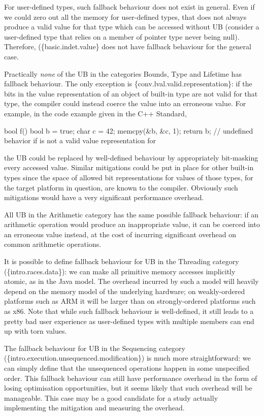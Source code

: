 For user-defined types, such fallback behaviour does not exist in general. Even if we could zero out all the memory for user-defined types, that does not always produce a valid value for that type which can be accessed without UB (consider a user-defined type that relies on a member of pointer type never being null). Therefore, (\{basic.indet.value\} does not have fallback behaviour for the general case.

Practically \emph{none} of the UB in the categories Bounds, Type and Lifetime has fallback behaviour. The only exception is \{conv.lval.valid.representation\}: if the bits in the value representation of an object of built-in type are not valid for that type, the compiler could instead coerce the value into an erroneous value. For example, in the code example given in the C++ Standard,

\begin{codeblock}
bool f() {
  bool b = true;
  char c = 42;
  memcpy(&b, &c, 1);
  return b;         // undefined behavior if  is not a valid value representation for 
}
\end{codeblock}

the UB could be replaced by well-defined behaviour by appropriately bit-masking every accessed  value. Similar mitigations could be put in place for other built-in types since the space of allowed bit representations for values of those types, for the target platform in question, are known to the compiler. Obviously such mitigations would have a very significant performance overhead.

All UB in the Arithmetic category has the same possible fallback behaviour: if an arithmetic operation would produce an inappropriate value, it can be coerced into an erroneous value instead, at the cost of incurring significant overhead on common arithmetic operations.

It is possible to define fallback behaviour for UB in the Threading category (\{intro.races.data\}): we can make all primitive memory accesses implicitly atomic, as in the Java model. The overhead incurred by such a model will heavily depend on the memory model of the underlying hardware; on weakly-ordered platforms such as ARM it will be larger than on strongly-ordered platforms such as x86. Note that while such fallback behaviour is well-defined, it still leads to a pretty bad user experience as user-defined types with multiple members can end up with torn values.

The fallback behaviour for UB in the Sequencing category (\{intro.execution.unsequenced.modification\}) is much more straightforward: we can simply define that the unsequenced operations happen in some unspecified order. This fallback behaviour can still have performance overhead in the form of losing  optimisation opportunities, but it seems likely that such overhead will be manageable. This case may be a good candidate for a study actually implementing the mitigation and measuring the overhead.

